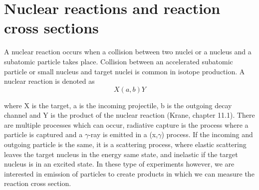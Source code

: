 


\section{Nuclear reactions and reaction cross sections}

A nuclear reaction occurs when a collision between two nuclei or a nucleus and a subatomic particle takes place. Collision between an accelerated subatomic particle or small nucleus and target nuclei is common in isotope production. A nuclear reaction is denoted as
\begin{equation}
    X(a,b)Y
\end{equation}

\noindent where X is the target, a is the incoming projectile, b is the outgoing decay channel and Y is the product of the nuclear reaction (Krane, chapter 11.1). There are multiple processes which can occur, radiative capture is the process where a particle is captured and a $\gamma$-ray is emitted in a (x,$\gamma$) process. If the incoming and outgoing particle is the same, it is a scattering process, where elastic scattering leaves the target nucleus in the energy same state, and inelastic if the target nucleus is in an excited state. In these type of experiments however, we are interested in emission of particles to create products in which we can measure the reaction cross section. \\

